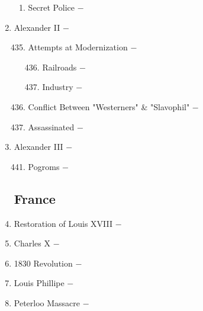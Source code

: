 \documentclass[12pt]{article}
\begin{document}
\begin{enumerate}
\begin{enumerate}[label=\arabic{*}.]
\item Secret Police $-$ 

\end{enumerate}

\setcounter{enumi}{433}

\item Alexander II $-$ 

\begin{enumerate}[label=\arabic{*}.]
\setcounter{enumii}{434}

\item Attempts at Modernization $-$

\begin{enumerate}[label=\arabic{*}.]
\setcounter{enumiii}{435}

\item Railroads $-$ 

\item Industry $-$

\end{enumerate}
\setcounter{enumii}{437}

\item Conflict Between "Westerners" \& "Slavophil" $-$

\item Assassinated $-$

\end{enumerate}
\setcounter{enumi}{439}

\item Alexander III $-$ 


\begin{enumerate}[label=\arabic{*}.]
\setcounter{enumii}{440}

\item Pogroms $-$ 

\end{enumerate}
\setcounter{enumi}{441}

\subsection{France}

\item Restoration of Louis XVIII $-$ 

\item Charles X $-$ 

\item 1830 Revolution $-$ 

\item Louis Phillipe $-$

\item Peterloo Massacre $-$ 


\end{enumerate}
\end{document}
